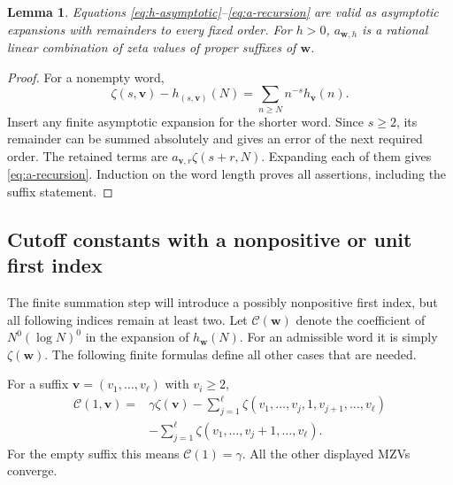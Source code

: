 \documentclass[11pt,letterpaper]{article}
\numberwithin{equation}{section}
\newtheorem{lemma}[theorem]{Lemma}
\theoremstyle{definition}\newtheorem{definition}[theorem]{Definition}
\theoremstyle{remark}\newtheorem{remark}[theorem]{Remark}
\begin{document}
\begin{lemma}\label{lem:a}
Equations \eqref{eq:h-asymptotic}--\eqref{eq:a-recursion} are valid
as asymptotic expansions with remainders to every fixed order.
For $h>0$, $a_{\boldsymbol w,h}$ is a rational linear combination
of zeta values of proper suffixes of $\boldsymbol w$.
\end{lemma}
\begin{proof}
For a nonempty word,
\[
 \zeta(s,\boldsymbol v)-h_{(s,\boldsymbol v)}(N)
 =\sum_{n\ge N}n^{-s}h_{\boldsymbol v}(n).
\]
Insert any finite asymptotic expansion for the shorter word.
Since $s\ge2$, its remainder can be summed absolutely and gives
an error of the next required order. The retained terms are
$a_{\boldsymbol v,r}\zeta(s+r,N)$. Expanding each of them gives
\eqref{eq:a-recursion}. Induction on the word length proves all
assertions, including the suffix statement.
\end{proof}

\subsection{Cutoff constants with a nonpositive or unit first index}

The finite summation step will introduce a possibly nonpositive first
index, but all following indices remain at least two. Let
$\mathcal C(\boldsymbol w)$ denote the coefficient of
$N^0(\log N)^0$ in the expansion of $h_{\boldsymbol w}(N)$.
For an admissible word it is simply $\zeta(\boldsymbol w)$.
The following finite formulas define all other cases that are needed.

For a suffix $\boldsymbol v=(v_1,\ldots,v_\ell)$ with $v_i\ge2$,
\begin{equation}\label{eq:C-one}
\begin{split}
 \mathcal C(1,\boldsymbol v)={}&\gamma\zeta(\boldsymbol v)
 -\sum_{j=1}^{\ell}\zeta(v_1,\ldots,v_j,1,v_{j+1},\ldots,v_\ell)\\
 &-\sum_{j=1}^{\ell}\zeta(v_1,\ldots,v_j+1,\ldots,v_\ell).
\end{split}
\end{equation}
For the empty suffix this means $\mathcal C(1)=\gamma$.
All the other displayed MZVs converge.
\end{document}

